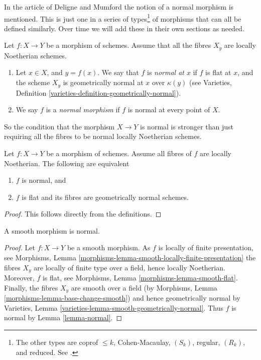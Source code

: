 \noindent
In the article \cite{DM} of Deligne and Mumford the notion of a normal
morphism is mentioned. This is just one in a series of types\footnote{
The other types are coprof $\leq k$, Cohen-Macaulay, $(S_k)$,
regular, $(R_k)$, and reduced. See \cite[IV Definition 6.8.1.]{EGA}.}
of morphisms that can all be defined similarly. Over time we will add
these in their own sections as needed.

\begin{definition}
\label{definition-normal}
Let $f : X \to Y$ be a morphism of schemes.
Assume that all the fibres $X_y$ are locally Noetherian schemes.
\begin{enumerate}
\item Let $x \in X$, and $y = f(x)$. We say that $f$ is {\it normal at $x$}
if $f$ is flat at $x$, and the scheme $X_y$ is geometrically
normal at $x$ over $\kappa(y)$ (see
Varieties, Definition \ref{varieties-definition-geometrically-normal}).
\item We say $f$ is a {\it normal morphism} if $f$ is normal
at every point of $X$.
\end{enumerate}
\end{definition}

\noindent
So the condition that the morphism $X \to Y$ is normal
is stronger than just requiring all
the fibres to be normal locally Noetherian schemes.

\begin{lemma}
\label{lemma-normal}
Let $f : X \to Y$ be a morphism of schemes.
Assume all fibres of $f$ are locally Noetherian.
The following are equivalent
\begin{enumerate}
\item $f$ is normal, and
\item $f$ is flat and its fibres are geometrically normal schemes.
\end{enumerate}
\end{lemma}

\begin{proof}
This follows directly from the definitions.
\end{proof}

\begin{lemma}
\label{lemma-smooth-normal}
A smooth morphism is normal.
\end{lemma}

\begin{proof}
Let $f : X \to Y$ be a smooth morphism.
As $f$ is locally of finite presentation, see
Morphisms, Lemma \ref{morphisms-lemma-smooth-locally-finite-presentation}
the fibres $X_y$ are locally of finite type over a field, hence
locally Noetherian. Moreover, $f$ is flat, see
Morphisms, Lemma \ref{morphisms-lemma-smooth-flat}.
Finally, the fibres $X_y$ are smooth over a field (by
Morphisms, Lemma \ref{morphisms-lemma-base-change-smooth})
and hence geometrically normal by
Varieties, Lemma \ref{varieties-lemma-smooth-geometrically-normal}.
Thus $f$ is normal by
Lemma \ref{lemma-normal}.
\end{proof}

